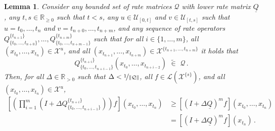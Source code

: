 \documentclass[10pt]{paper}
\newtheorem{lemma}[theorem]{Lemma}
\newcommand{\reals}{\mathbb{R}}
\newcommand{\realspos}{\reals_{>0}}
\newcommand{\realsnonneg}{\reals_{\geq 0}}
\newcommand{\states}{\mathcal{X}}
\newcommand{\gambles}{\mathcal{L}}
\newcommand{\lrate}{\underline{Q}}
\newcommand{\norm}[1]{\left\lVert #1 \right\rVert}
\newcommand{\opinset}{\,\,\widetilde{\in}\,\,}
\begin{document}
\begin{lemma}\label{lemma:nonmarkov_rateproduct_bounded_by_lrate}
Consider any bounded set of rate matrices $\mathcal{Q}$ with lower rate matrix $\lrate$, any $t,s\in\realsnonneg$ such that $t<s$, any $u\in\mathcal{U}_{[0,t]}$ and $v\in\mathcal{U}_{[t,s]}$ such that $u=t_0,\ldots,t_n$ and $v=t_{n+0},\ldots,t_{n+m}$, and any sequence of rate operators $Q_{\{t_0,\ldots,t_{n+0}\}}^{\{t_{n+1}\}},\ldots,Q_{\{t_0,\ldots,t_{n+m-1}\}}^{\{t_{n+m}\}}$ such that for all $i\in\{1,\ldots,m\}$, all $(x_{t_0},\ldots,x_{t_n})\in\states^u$, and all $(x_{t_{n+1}},\ldots,x_{t_{n+m}})\in\states^{\{t_{n+1},\ldots,t_{n+m}\}}$ it holds that 
\begin{equation*}
Q_{\{t_0,\ldots,t_{n+i-1}\}}^{\{t_{n+i}\}}(x_{t_0},\ldots,x_{t_{n+i-2}})\opinset\mathcal{Q}\,.
\end{equation*}
Then, for all $\Delta\in\realspos$ such that $\Delta<\nicefrac{1}{\norm{\mathcal{Q}}}$, all $f\in\gambles(\states^{\{s\}})$, and all $(x_{t_0},\ldots,x_{t_n})\in\states^u$,
\begin{align*}
\left[\left(\prod_{i=1}^m \left(I + \Delta Q_{\{t_0,\ldots,t_{n+i-1}\}}^{\{t_{n+i}\}} \right)\right)f\right](x_{t_0},\ldots,x_{t_n}) &\geq \left[\left(I + \Delta \lrate\right)^m f\right](x_{t_0},\ldots,x_{t_n})\\
 &= \left[\left(I + \Delta \lrate\right)^m f\right](x_{t_n})\,.
\end{align*}
\end{lemma}
\end{document}
